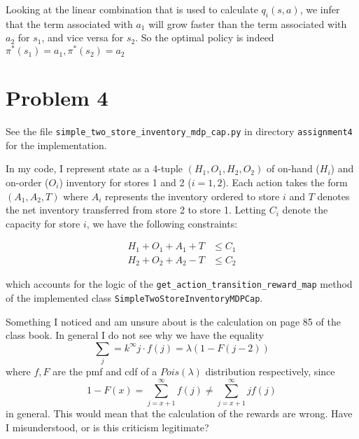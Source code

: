 \documentclass{article}
\begin{document}
Looking at the linear combination that is used to calculate $q_i(s,a)$, we infer that the term associated with $a_1$ will grow faster than the term associated with $a_2$ for $s_1$, and vice versa for $s_2$. So the optimal policy is indeed $\pi^*(s_1)=a_1, \pi^*(s_2)=a_2$

\section*{Problem 4}

See the file \texttt{simple\_two\_store\_inventory\_mdp\_cap.py} in directory \texttt{assignment4} for the implementation.

In my code, I represent state as a 4-tuple $(H_1, O_1, H_2, O_2)$ of on-hand ($H_i$) and on-order ($O_i$) inventory for stores 1 and 2 ($i=1,2$). Each action takes the form $(A_1, A_2, T)$ where $A_i$ represents the inventory ordered to store $i$ and $T$ denotes the net inventory transferred from store 2 to store 1. Letting $C_i$ denote the capacity for store $i$, we have the following constraints:

\begin{align}
    H_1 + O_1 + A_1 + T &\leq C_1\\
    H_2 + O_2 + A_2 - T &\leq C_2
\end{align}

which accounts for the logic of the \texttt{get\_action\_transition\_reward\_map} method of the implemented class \texttt{SimpleTwoStoreInventoryMDPCap}.

Something I noticed and am unsure about is the calculation on page 85 of the class book. In general I do not see why we have the equality 
\[ \sum_j=k^\infty j \cdot f(j) = \lambda(1 - F(j-2))\]
where $f, F$ are the pmf and cdf of a $Pois(\lambda)$ distribution respectively, since \[1 - F(x) = \sum_{j=x+1}^{\infty} f(j) \neq \sum_{j=x+1}^{\infty} j f(j)\] in general. This would mean that the calculation of the rewards are wrong. Have I misunderstood, or is this criticism legitimate?
\end{document}
